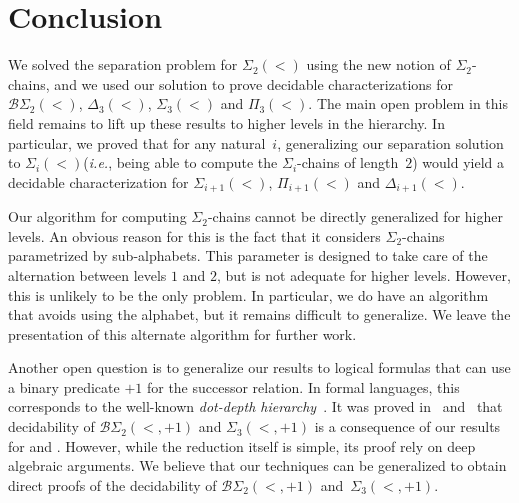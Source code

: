 \documentclass[envcountsame]{llncs}
\newcommand{\dew}[1]{\ensuremath{\Delta_{#1}(<)}\xspace}
\newcommand{\sic}[1]{\ensuremath{\Sigma_{#1}}\xspace}
\newcommand{\siw}[1]{\ensuremath{\Sigma_{#1}(<)}\xspace}
\newcommand{\piw}[1]{\ensuremath{\Pi_{#1}(<)}\xspace}
\newcommand{\bsw}[1]{\ensuremath{\mathcal{B}\Sigma_{#1}(<)}\xspace}
\newcommand{\dewu}{\ensuremath{\Delta_{1}(<)}\xspace}
\newcommand{\siwu}{\ensuremath{\Sigma_{1}(<)}\xspace}
\newcommand{\piwu}{\ensuremath{\Pi_{1}(<)}\xspace}
\newcommand{\bswu}{\ensuremath{\mathcal{B}\Sigma_{1}(<)}\xspace}
\newcommand{\dewd}{\ensuremath{\Delta_{2}(<)}\xspace}
\newcommand{\siwd}{\ensuremath{\Sigma_{2}(<)}\xspace}
\newcommand{\piwd}{\ensuremath{\Pi_{2}(<)}\xspace}
\newcommand{\bswd}{\ensuremath{\mathcal{B}\Sigma_{2}(<)}\xspace}
\newcommand{\dewt}{\ensuremath{\Delta_{3}(<)}\xspace}
\newcommand{\siwt}{\ensuremath{\Sigma_{3}(<)}\xspace}
\newcommand{\piwt}{\ensuremath{\Pi_{3}(<)}\xspace}
\newcommand{\bswt}{\ensuremath{\mathcal{B}\Sigma_{3}(<)}\xspace}
\newcommand{\bspd}{\ensuremath{\mathcal{B}\Sigma_{2}(<,+1)}\xspace}
\newcommand{\sipt}{\ensuremath{\Sigma_{3}(<,+1)}\xspace}
\newcommand{\dewi}{\ensuremath{\Delta_{i}(<)}\xspace}
\newcommand{\siwi}{\ensuremath{\Sigma_{i}(<)}\xspace}
\newcommand{\piwi}{\ensuremath{\Pi_{i}(<)}\xspace}
\newcommand{\bswi}{\ensuremath{\mathcal{B}\Sigma_{i}(<)}\xspace}
\newcommand{\fow}{\ensuremath{\textup{FO}(<)}\xspace}
\newcommand{\restorenotation}{
\let\dew\dews
\let\siw\siws
\let\piw\piws
\let\bsw\bsws
\let\dewu\dewus
\let\siwu\siwus
\let\piwu\piwus
\let\bswu\bswus
\let\dewd\dewds
\let\siwd\siwds
\let\piwd\piwds
\let\bswd\bswds
\let\dewt\dewts
\let\siwt\siwts
\let\piwt\piwts
\let\bswt\bswts
\let\dewi\dewis
\let\siwi\siwis
\let\piwi\piwis
\let\bswi\bswis
\let\fow\fows
}
\newcommand\qchains[1]{\ensuremath{\sic{#1}}-chains\xspace}
\newcommand\ichains{\qchains{i}}
\newcommand\dchains{\qchains{2}}
\begin{document}
\section{Conclusion}
\label{sec:conc}
We solved the separation problem for \siwd using the new notion of \dchains,
and we used our solution to prove decidable characterizations for \bswd,
\dewt, \siwt and \piwt. The main open problem in this field remains to lift up
these results to higher levels in the hierarchy. In particular, we proved that
for any natural~$i$, generalizing our separation solution to \siwi (\emph{i.e.}, being able
to compute the \ichains of length~$2$) would yield a decidable
characterization for \siw{i+1}, \piw{i+1} and \dew{i+1}.

Our algorithm for computing \dchains cannot be directly generalized
for higher levels. An obvious reason for this is the fact that it
considers \dchains parametrized by sub-alphabets. This parameter is
designed to take care of the alternation between levels $1$ and $2$,
but is not adequate for higher levels. However, this is unlikely
to be the only problem. In particular, we do have an algorithm that
avoids using the alphabet, but it remains difficult to generalize. We 
leave the presentation of this alternate algorithm for further work.

\restorenotation
Another open question is to generalize our results to logical
formulas that can use a binary predicate $+1$ for the successor
relation. In formal languages, this corresponds to the well-known
\emph{dot-depth hierarchy}~\cite{BrzoDot}. It was proved
in~\cite{StrauVD} and~\cite{pinweilVD} that decidability of \bspd and
\sipt is a consequence of our results for \bswd and \siwt.
However, while the reduction itself is simple, its proof rely on deep
algebraic arguments. We believe that our techniques can be generalized
to obtain direct proofs of the decidability of \bspd and~\sipt.
\end{document}
